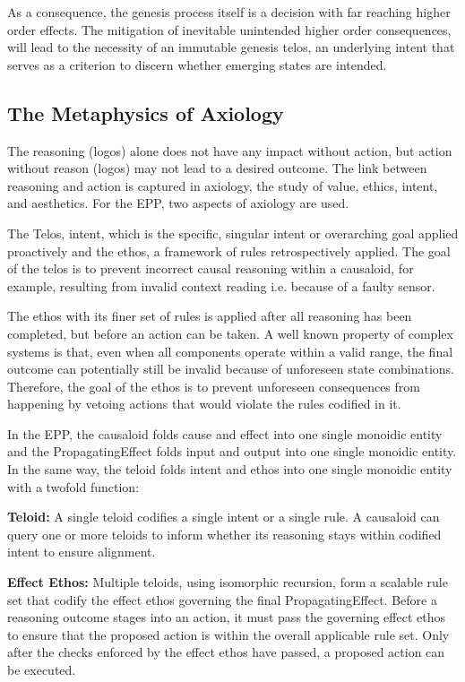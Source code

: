 As a consequence, the genesis process itself is a decision with far reaching higher order effects. The mitigation of inevitable unintended higher order consequences, will lead to the necessity of an immutable genesis telos, an underlying intent that serves as a criterion to discern whether emerging states are intended. 


\subsection{The Metaphysics of Axiology} 
\label{sec:metaphysics_axiology}

The reasoning (logos) alone does not have any impact without action, but action without reason (logos) may not lead to a desired outcome. The link between reasoning and action is captured in axiology, the study of value, ethics, intent, and aesthetics. For the EPP, two aspects of axiology are used. 

The Telos, intent, which is the specific, singular intent or overarching goal applied proactively and the ethos, a framework of rules retrospectively applied. The goal of the telos is to prevent incorrect causal reasoning within a causaloid, for example, resulting from invalid context reading i.e. because of a faulty sensor. 

The ethos with its finer set of rules is applied after all reasoning has been completed, but before an action can be taken. A well known property of complex systems is that, even when all components operate within a valid range, the final outcome can potentially still be invalid because of unforeseen state combinations. Therefore, the goal of the ethos is to prevent unforeseen consequences from happening by vetoing actions that would violate the rules codified in it. 

In the EPP, the causaloid folds cause and effect into one single monoidic entity and the PropagatingEffect folds input and output into one single monoidic entity. In the same way, the teloid folds intent and ethos into one single monoidic entity with a twofold function:

\textbf{Teloid:} A single teloid codifies a single intent or a single rule. A causaloid can query one or more teloids to inform whether its reasoning stays within codified intent to ensure alignment. 

\textbf{Effect Ethos:} Multiple teloids, using isomorphic recursion, form a scalable rule set that codify the effect ethos governing the final PropagatingEffect. Before a reasoning outcome stages into an action, it must pass the governing effect ethos to ensure that the proposed action is within the overall applicable rule set. Only after the checks enforced by the effect ethos have passed, a proposed action can be executed. 

